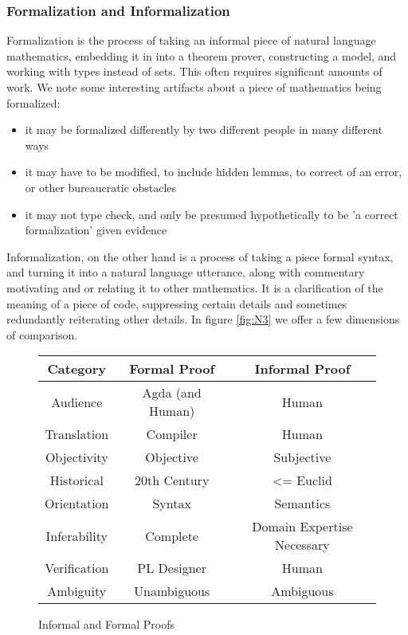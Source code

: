 \subsubsection{Formalization and Informalization}

Formalization is the process of taking an informal piece of natural language
mathematics, embedding it in into a theorem prover, constructing a model,
and working with types instead of sets. This often requires significant amounts of
work. We note some interesting artifacts about a piece of mathematics
being formalized:

\begin{itemize}

\item it may be formalized differently by two different people in many different ways
\item it may have to be modified, to include hidden lemmas, to correct of an
  error, or other bureaucratic obstacles
\item it may not type check, and only be presumed hypothetically to be 'a
  correct formalization' given evidence 

\end{itemize}

Informalization, on the other hand is a process of taking a piece formal syntax, and turning it into a natural
language utterance, along with commentary motivating and or relating it to other
mathematics. It is a clarification of the meaning of a piece of
code, suppressing certain details and sometimes
redundantly reiterating other details. In figure \autoref{fig:N3} we offer a few
dimensions of comparison.

\begin{figure}
\centering
\begin{tabular}{|c|c|c|} \hline
  Category & Formal Proof & Informal Proof \\ \hline
  Audience & Agda (and Human) & Human \\ \hline
  Translation & Compiler & Human \\ \hline
  Objectivity & Objective & Subjective \\ \hline %
  Historical & 20th Century & <= Euclid \\ \hline
  Orientation & Syntax & Semantics \\ \hline
  Inferability & Complete & Domain Expertise Necessary \\ \hline
  Verification & PL Designer & Human \\ \hline
  Ambiguity & Unambiguous & Ambiguous \\ \hline

\end{tabular}
\caption{Informal and Formal Proofs} \label{fig:N3}
\end{figure}

